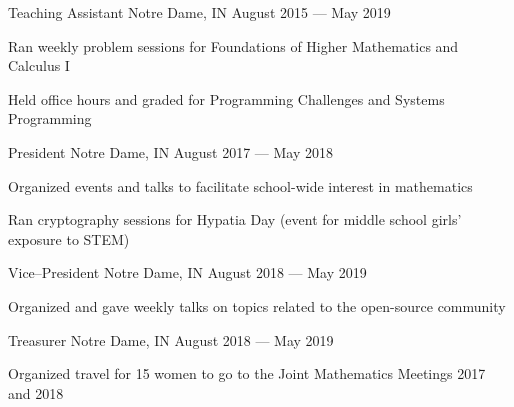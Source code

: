 \begin{cventries}
  {Teaching Assistant}
  {Notre Dame, IN}
  {August 2015 --- May 2019}
  {\begin{cvitems}
  \item Ran weekly problem sessions for Foundations of Higher Mathematics and
    Calculus I
  \item Held office hours and graded for Programming Challenges and Systems Programming
    \end{cvitems}
  }
  {President}
  {Notre Dame, IN}
  {August 2017 --- May 2018}
  {\begin{cvitems}
  \item Organized events and talks to facilitate school-wide interest in mathematics
  \item Ran cryptography sessions for Hypatia Day (event for middle school
    girls' exposure to STEM)
    \end{cvitems}
  }
  {Vice--President}
  {Notre Dame, IN}
  {August 2018 --- May 2019}
  {\begin{cvitems}
  \item Organized and gave weekly talks on topics related to the open-source
    community
    \end{cvitems}
  }
  {Treasurer}
  {Notre Dame, IN}
  {August 2018 --- May 2019}
  {\begin{cvitems}
  \item Organized travel for 15 women to go to the Joint Mathematics Meetings
    2017 and 2018
    \end{cvitems}
  }
\end{cventries}
